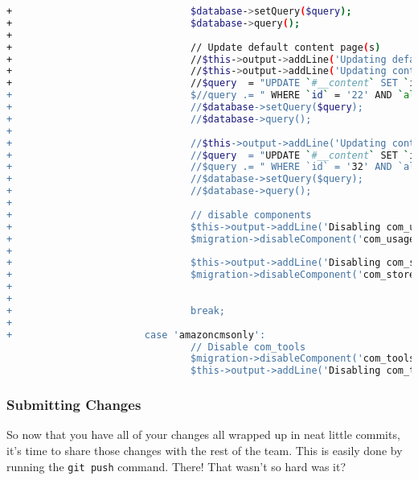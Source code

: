 \documentclass[10pt,letterpaper,titlepage]{article}
\begin{document}
\begin{lstlisting}[caption={Style for commit messages used in HubZERO web development.},language=Bash,label=badcommit]
+                               $database->setQuery($query);
+                               $database->query();
+
+                               // Update default content page(s)
+                               //$this->output->addLine('Updating default content pages');
+                               //$this->output->addLine('Updating content page id (22)');
+                               //$query  = "UPDATE `#__content` SET `introtext` = '{xhub:include type=\"stylesheet\" filename=\"pages/discover.css\"}\r\n<div class=\"grid\">\r\n    <div class=\"col span-quarter\">\r\n        <h2>Do Mo
+                               $//query .= " WHERE `id` = '22' AND `alias` = 'discover'";
+                               //$database->setQuery($query);
+                               //$database->query();
+
+                               //$this->output->addLine('Updating content page id (32)');
+                               //$query  = "UPDATE `#__content` SET `introtext` = '{xhub:include type=\"stylesheet\" filename=\"pages/gettingstarted.css\"}\r\n\r\n<div class=\"explore-section\">\r\n <div class=\"wrap\">\r\n        
+                               //$query .= " WHERE `id` = '32' AND `alias` = 'gettingstarted'";
+                               //$database->setQuery($query);
+                               //$database->query();
+
+                               // disable components
+                               $this->output->addLine('Disabling com_usage');
+                               $migration->disableComponent('com_usage');
+
+                               $this->output->addLine('Disabling com_store');
+                               $migration->disableComponent('com_store');
+
+
+                               break;
+
+                       case 'amazoncmsonly':
                                // Disable com_tools
                                $migration->disableComponent('com_tools');
                                $this->output->addLine('Disabling com_tools');
\end{lstlisting}

\subsubsection{Submitting Changes}
So now that you have all of your changes all wrapped up in neat little commits, it's time to share those changes with the rest of the team.
This is easily done by running the \texttt{git push} command. There! That wasn't so hard was it?

\end{document}

